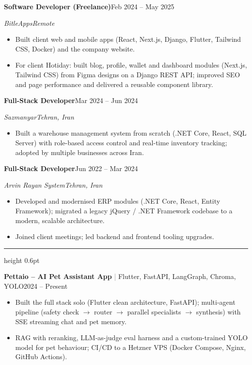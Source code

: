 \documentclass[10pt,a4paper]{article}
\renewcommand{\section}[1]{%
  \vspace{6pt}{\bfseries\color{accent}\MakeUppercase{#1}}\par\nointerlineskip\vspace{1.5pt}%
  {\color{accent}\hrule height 0.6pt}\vspace{3pt}}
\newcommand{\entry}[4]{%
  \vspace{3pt}\textbf{#1}\hfill #3\par
  \textit{#2}\hfill\textit{#4}\par\vspace{1pt}}
\newcommand{\project}[3]{%
  \vspace{3pt}\textbf{#1} \textcolor{gray}{|} {\small #2}\hfill #3\par\vspace{1pt}}
\begin{document}
\entry{Software Developer (Freelance)}{BitleApps}{Feb 2024 -- May 2025}{Remote}
\begin{itemize}
  \item Built client web and mobile apps (React, Next.js, Django, Flutter, Tailwind CSS, Docker) and the company website.
  \item For client Hotiday: built blog, profile, wallet and dashboard modules (Next.js, Tailwind CSS) from Figma designs
        on a Django REST API; improved SEO and page performance and delivered a reusable component library.
\end{itemize}

\entry{Full-Stack Developer}{Sazmanyar}{Mar 2024 -- Jun 2024}{Tehran, Iran}
\begin{itemize}
  \item Built a warehouse management system from scratch (.NET Core, React, SQL Server) with role-based access
        control and real-time inventory tracking; adopted by multiple businesses across Iran.
\end{itemize}

\entry{Full-Stack Developer}{Arvin Rayan System}{Jun 2022 -- Mar 2024}{Tehran, Iran}
\begin{itemize}
  \item Developed and modernised ERP modules (.NET Core, React, Entity Framework); migrated a legacy
        jQuery / .NET Framework codebase to a modern, scalable architecture.
  \item Joined client meetings; led backend and frontend tooling upgrades.
\end{itemize}

\section{Projects}

\project{Pettaio -- AI Pet Assistant App}{Flutter, FastAPI, LangGraph, Chroma, YOLO}{2024 -- Present}
\begin{itemize}
  \item Built the full stack solo (Flutter clean architecture, FastAPI); multi-agent pipeline (safety check
        $\rightarrow$ router $\rightarrow$ parallel specialists $\rightarrow$ synthesis) with SSE streaming chat and pet memory.
  \item RAG with reranking, LLM-as-judge eval harness and a custom-trained YOLO model for pet behaviour; CI/CD to a
        Hetzner VPS (Docker Compose, Nginx, GitHub Actions).
\end{itemize}
\end{document}
